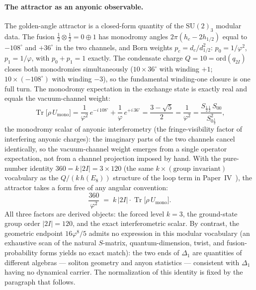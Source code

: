 \documentclass[11pt,a4paper]{article}
\theoremstyle{definition}
\theoremstyle{remark}
\newcommand{\vp}{\varphi}
\begin{document}
\paragraph{The attractor as an anyonic observable.}
The golden-angle attractor is a closed-form quantity of the
$\mathrm{SU}(2)_3$ modular data. The fusion $\tfrac12\otimes\tfrac12
= 0 \oplus 1$ has monodromy angles $2\pi(h_c - 2h_{1/2})$ equal to
$-108^\circ$ and $+36^\circ$ in the two channels, and Born weights
$p_c = d_c/d_{1/2}^2$: $p_0 = 1/\vp^2$, $p_1 = 1/\vp$, with
$p_0 + p_1 = 1$ exactly. The condensate charge
$Q = 10 = \mathrm{ord}(q_{2I})$ closes both monodromies
simultaneously ($10 \times 36^\circ$ with winding $+1$;
$10 \times (-108^\circ)$ with winding $-3$), so the fundamental
winding-one closure is one full turn. The monodromy expectation in
the exchange state is exactly real and equals the vacuum-channel
weight:
\[
  \operatorname{Tr}\bigl[\rho\, U_{\mathrm{mono}}\bigr]
  = \frac{1}{\vp^2}\,e^{-i\,108^\circ}
  + \frac{1}{\vp}\,e^{+i\,36^\circ}
  = \frac{3-\sqrt5}{2}
  = \frac{1}{\vp^2}
  = \frac{S_{\frac12\frac12}\,S_{00}}{S_{0\frac12}^{2}},
\]
the monodromy scalar of anyonic interferometry (the fringe-visibility
factor of interfering anyonic charges): the imaginary parts of the
two channels cancel identically, so the vacuum-channel weight emerges
from a single operator expectation, not from a channel projection
imposed by hand. With the pure-number identity $360 = k\,|2I| = 3
\times 120$ (the same $k \times (\text{group invariant})$ vocabulary
as the $Q/(k\,h(E_8))$ structure of the loop term in
Paper~IV~\cite{Paper4}), the attractor takes a form free of any
angular convention:
\[
  \frac{360}{\vp^2}
  \;=\; k\,|2I| \cdot
  \operatorname{Tr}\bigl[\rho\, U_{\mathrm{mono}}\bigr].
\]
All three factors are derived objects: the forced level $k=3$, the
ground-state group order $|2I| = 120$, and the exact interferometric
scalar. By contrast, the geometric endpoint $16\vp^8/5$ admits no
expression in this modular vocabulary (an exhaustive scan of the
natural $S$-matrix, quantum-dimension, twist, and fusion-probability
forms yields no exact match): the two ends of $\Delta_1$ are
quantities of different algebras --- soliton geometry and anyon
statistics --- consistent with $\Delta_1$ having no dynamical
carrier. The normalization of this identity is fixed by the
paragraph that follows.
\end{document}
